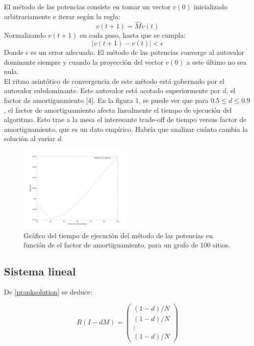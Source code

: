 \documentclass[%
    final,
    notitlepage,
    narroweqnarray,
    inline,
    twoside,
    invited
    ]{ieee}
\begin{document}
El método de las potencias
consiste en tomar un vector $v(0)$ inicializado
arbitrariamente e iterar según la regla:
\begin{equation}
v(t+1) = \widehat{M}v(t)
\end{equation}
Normalizando $v(t+1)$ en cada paso, hasta que se cumpla:
\begin{equation}
\left| v(t+1) - v(t) \right| < \epsilon
\end{equation}
Donde $\epsilon$ es un error adecuado. El método de las potencias converge al autovalor dominante siempre y cuando la proyección del
vector $v(0)$ a este último no sea nula.\\

El ritmo asintótico de convergencia de este método está gobernado por el autovalor subdominante. Este autovalor está acotado
superiormente por $d$, el factor de amortiguamiento [4]. En la figura 1, se puede ver que para $0.5 \leq d \leq 0.9$, el
factor de amortiguamiento afecta linealmente el tiempo de ejecución del algoritmo.
Esto trae a la mesa el interesante trade-off de tiempo versus factor de amortiguamiento, que es un dato empírico. Habría que
 analizar cuánto cambia la solución al variar $d$.

\begin{figure}[h!]
    \centering
    \includegraphics[width=0.5\textwidth]{d_pm.png} %
    \caption {Gráfico del tiempo de ejecución del método de las potencias en función de el factor de amortiguamiento, para un grafo de 100 sitios.}
\end{figure}

\subsection{Sistema lineal}

De \eqref{pranksolution} se deduce:

\begin{equation}
    R (I - dM) = \begin{pmatrix}
                     (1-d)/N \\ (1-d)/N \\ \vdots \\ (1-d)/N
                 \end{pmatrix}
\end{equation}
\end{document}
